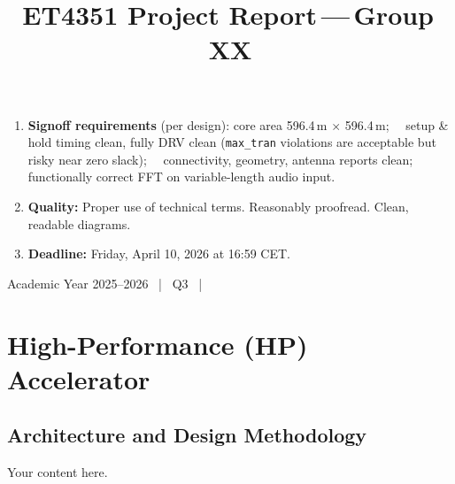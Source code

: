 \documentclass[conference]{IEEEtran}
\newcommand{\micron}{\textmu m}
\begin{document}
{\begin{minipage}{\dimexpr\textwidth-2\fboxsep-2\fboxrule}
{\begin{enumerate}[leftmargin=*, itemsep=1pt, parsep=0pt]
    \item \textbf{Signoff requirements} (per design):
        core area 596.4\,\micron{} $\times$ 596.4\,\micron;~~
        setup \& hold timing clean, fully DRV clean
        (\texttt{max\_tran} violations are acceptable but risky near zero slack);~~
        connectivity, geometry, antenna reports clean;~~
        functionally correct FFT on variable-length audio input.

    \item \textbf{Quality:} Proper use of technical terms. Reasonably proofread. Clean, readable diagrams.

    \item \textbf{Deadline:} Friday, April 10, 2026 at 16:59 CET.
\end{enumerate}
}
\vspace{2pt}
\end{minipage}%
}

\vfill

\begin{center}
{\small\color{darkgray} Academic Year 2025--2026 ~|~ Q3 ~|~}
\end{center}

\clearpage

\twocolumn
{}

\title{ET4351 Project Report\,---\,Group\,{\color{red}XX}}

\author{}

\maketitle

\section{\textcolor{hpcolor}{High-Performance (HP) Accelerator}}\label{sec:hp}

\subsection{Architecture and Design Methodology}\label{sec:hp:arch}

{\color{hpcolor}Your content here.}
\end{document}
